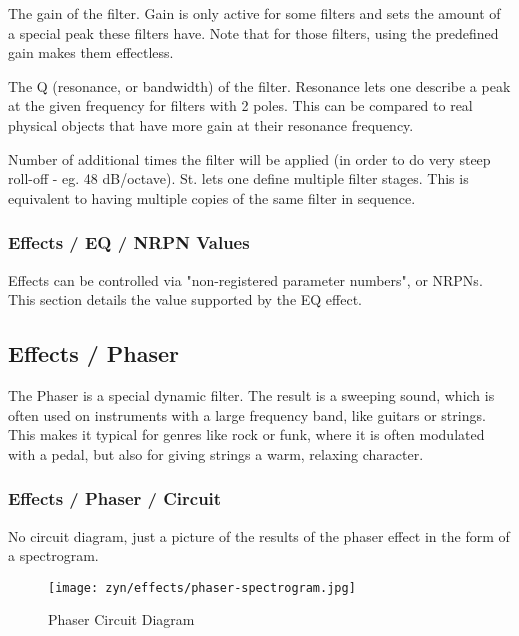    The gain of the filter.
   Gain is only active for some filters and sets the amount of a special
   peak these filters have. Note that for those filters, using the
   predefined gain makes them effectless.

   The Q (resonance, or bandwidth) of the filter.
   Resonance lets one describe a peak at the given frequency for filters
   with 2 poles. This can be compared to real physical objects that have
   more gain at their resonance frequency.

   Number of additional times the filter will be applied (in
   order to do very steep roll-off - eg. 48 dB/octave).
   St. lets one define multiple filter stages. This is equivalent to
   having multiple copies of the same filter in sequence.

\subsubsection{Effects / EQ / NRPN Values}
\label{subsubsec:effects_edit_eq_nrpn}

   Effects can be controlled via "non-registered parameter numbers", or NRPNs.
   This section details the value supported by the EQ effect.

\subsection{Effects / Phaser}
\label{subsec:effects_edit_phaser}

   The Phaser is a special dynamic filter. The result is a sweeping sound,
   which is often used on instruments with a large frequency band, like
   guitars or strings. This makes it typical for genres like rock or funk,
   where it is often modulated with a pedal, but also for giving strings a
   warm, relaxing character.

\subsubsection{Effects / Phaser / Circuit}
\label{subsubsec:effects_edit_phaser_circuit}

   No circuit diagram, just a picture of the results of the phaser effect in the
   form of a spectrogram.

\begin{figure}[H]
   \centering 
   \texttt{[image: zyn/effects/phaser-spectrogram.jpg]}
   \caption{Phaser Circuit Diagram}
   \label{fig:phaser_circuit_diagram}
\end{figure}


